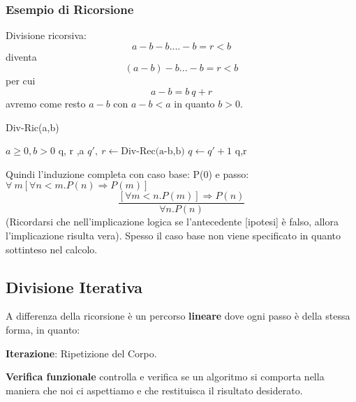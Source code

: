 \documentclass[twocolumn]{article}
\newcommand{\definition}[1]{\begin{mycolorbox}[colback=colorone]
\fontfamily{qcr}\selectfont #1 \fontfamily{cmr}\selectfont
\end{mycolorbox}}
\begin{document}
\subsubsection{Esempio di Ricorsione}
Divisione ricorsiva:
\[a-b-b....-b = r < b\]
diventa
\[ (a-b)-b...-b=r < b\]
per cui \[ a - b = b \ q + r\]
avremo come resto $a -b$ con $a-b < a$ in quanto $b > 0$.
\begin{algorithm}
    \caption{Div-Ric(a,b)}
    \begin{algorithmic}
        \REQUIRE $a \geq 0, b > 0$
        \ENSURE
        \STATE q, \: r ,a
        \ELSE 
        \STATE $q', \: r \leftarrow \text{Div-Rec(a-b,b)}$
        \STATE $q \leftarrow q' + 1$
        \ENDIF
        \RETURN q,r
    \end{algorithmic}
\end{algorithm}
\newline
Quindi l'induzione completa con caso base: P(0) \newline e passo: \newline $\forall \: m[\forall n < m.P(n) \Rightarrow P(m)]$
\[\frac{[\forall m < n.P(m)] \Rightarrow P(n)}{\forall n.P(n)}\]
(Ricordarsi che nell'implicazione logica se l'antecedente [ipotesi] è falso, allora l'implicazione risulta vera). Spesso il caso base non viene specificato in quanto sottinteso nel calcolo.

\subsection{Divisione Iterativa}
A differenza della ricorsione è un percorso \textbf{lineare} dove ogni passo è della stessa forma, in quanto:\newline
\definition{\textbf{Iterazione}: Ripetizione del Corpo.}\newline
\textbf{Verifica funzionale} controlla e verifica se un algoritmo si comporta nella maniera che noi ci aspettiamo e che restituisca il risultato desiderato. 
\end{document}
